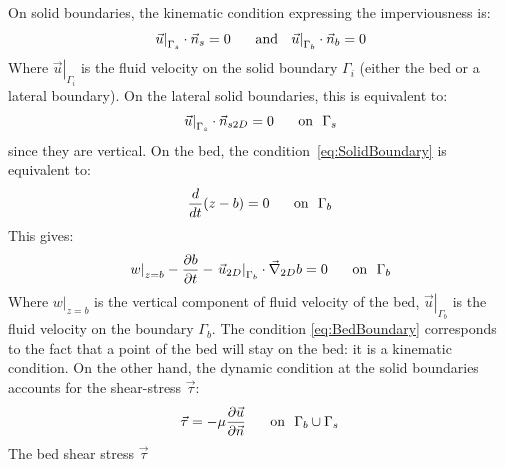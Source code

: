 On solid boundaries, the kinematic condition expressing the imperviousness is:
\begin{align}
  \left.\vec{u}\right\rvert_{\Gamma_s}\cdot\vec{n}_s = 0\hspace{0.5cm}\text{ and ~} \left.\vec{u}\right\rvert_{\Gamma_b}\cdot\vec{n}_b = 0
  \label{eq:SolidBoundary}
\end{align}
Where $\left.\vec{u}\right\rvert_{\Gamma_i}$ is the fluid velocity on the solid boundary $\Gamma_i$
(either the bed or a lateral boundary).
On the lateral solid boundaries, this is equivalent to:
\begin{align}
  \left.\vec{u}\right\rvert_{\Gamma_s}\cdot\vec{n}_{s2D} = 0\hspace{0.5cm}\text{ on ~}\Gamma_s
  \label{eq:LatSolidBoundary}
\end{align}
since they are vertical.
On the bed, the condition~\eqref{eq:SolidBoundary} is equivalent to:
\begin{align}
  \dfrac{d}{dt}(z-b)=0\hspace{0.5cm}\text{ on ~}\Gamma_b
\end{align}
This gives:
\begin{align}
  \left.w\right\rvert_{z=b} - \dfrac{\partial b}{\partial t} - \left.\vec{u}_{2D}\right\rvert_{\Gamma_b}\cdot\vec \nabla_{2D} b = 0\hspace{0.5cm}\text{ on ~}\Gamma_b
  \label{eq:BedBoundary}
\end{align}
Where $\left.w\right\rvert_{z=b}$ is the vertical component of fluid velocity of the bed, $\left.\vec{u}\right\rvert_{\Gamma_b}$ is the fluid velocity on the boundary $\Gamma_b$.
The condition \eqref{eq:BedBoundary} corresponds to the fact that a point of the bed will stay on the bed:
it is a kinematic condition.
On the other hand, the dynamic condition at the solid boundaries accounts for the shear-stress $\vec{\tau}$:
\begin{align}
  \vec{\tau} = -\mu\dfrac{\partial \vec{u}}{\partial\vec{n}}\hspace{0.5cm}\text{ on ~}\Gamma_b \cup \Gamma_s
\end{align}
The bed shear stress $\vec{\tau}$
